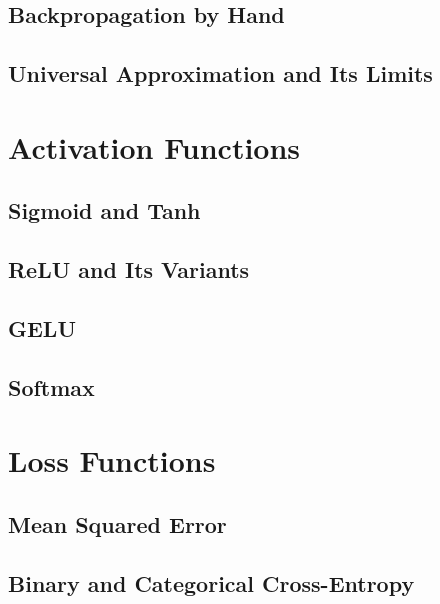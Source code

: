 \subsection{Backpropagation by Hand}

\subsection{Universal Approximation and Its Limits}

\section{Activation Functions}
\label{sec:activations}


\subsection{Sigmoid and Tanh}

\subsection{ReLU and Its Variants}

\subsection{GELU}

\subsection{Softmax}

\section{Loss Functions}
\label{sec:losses}

\subsection{Mean Squared Error}

\subsection{Binary and Categorical Cross-Entropy}

